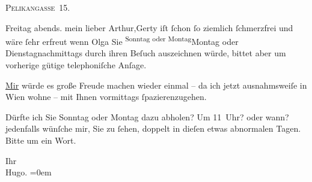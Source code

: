 \pstart
           \raggedleft{}\textsc{Pelikangasse 15}.\pend
           
\pstart
           Freitag{ }abends.\pend
           \vspace{0.5em}
\pstart
           mein lieber Arthur,\hspace*{1.5em}Gerty iſt{ }ſchon{ }ſo ziemlich{ }ſchmerzfrei und
               wäre{ }ſehr erfreut wenn Olga Sie \substVorne{}\textsuperscript{Sonntag oder Montag}\substDazwischen{}Montag oder Dienstag\substHinten{}{ }{\pb}nachmittags durch ihren Beſuch
               auszeichnen würde, bittet aber um vorherige gütige telephoniſche Anſage.\pend
           
\pstart
           \uline{Mir} würde es große Freude machen wieder einmal – da
               ich jetzt ausnahmsweiſe in Wien wohne – mit Ihnen
               vormittags{ }ſpazierenzugehen.\pend
           
\pstart
           Dürfte ich Sie Sonntag oder Montag dazu abholen? Um
                  11 Uhr? oder wann? jedenfalls wünſche mir, Sie zu{ }ſehen, doppelt in
               dieſen etwas abnormalen Tagen. Bitte um ein Wort.\pend
           
\pstart
           Ihr{\\[\baselineskip]}\spacefill\mbox{Hugo.}\pend
           \leftskip=0em{}\endnumbering{}  \newcommand{\dateiname}{L01923}\newcommand{\titel}{Hugo von Hofmannsthal an Arthur Schnitzler, 8. 4. 1910}\newcommand{\editorInnen}{Martin Anton Müller und Gerd-Hermann Susen}
